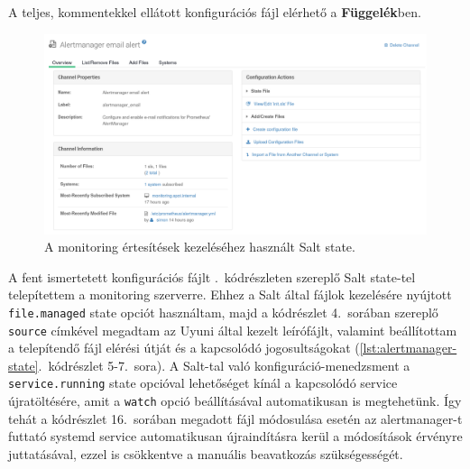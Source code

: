 A teljes, kommentekkel ellátott konfigurációs fájl elérhető a \textbf{Függelék}ben. %


\begin{figure}[ht]
	\centering
	\includegraphics[width=15cm]{figures/alertmanager-state.png}
	\caption{A monitoring értesítések kezeléséhez használt Salt state.}
	\label{fig:alertmanager-state}
\end{figure}



A fent ismertetett konfigurációs fájlt .~kódrészleten szereplő Salt state-tel telepítettem a monitoring szerverre. Ehhez a Salt által fájlok kezelésére nyújtott \texttt{file.managed} state opciót használtam, majd a kódrészlet 4.~sorában szereplő \texttt{source} címkével megadtam az Uyuni által kezelt leírófájlt, valamint beállítottam a telepítendő fájl elérési útját és a kapcsolódó jogosultságokat (\ref{lst:alertmanager-state}.~kódrészlet 5-7.~sora). 
A Salt-tal való konfiguráció-menedzsment a \texttt{service.running} state opcióval lehetőséget kínál a kapcsolódó service újratöltésére, amit a \texttt{watch} opció beállításával automatikusan is megtehetünk. Így tehát a kódrészlet 16.~sorában megadott fájl módosulása esetén az alertmanager-t futtató systemd service automatikusan újraindításra kerül a módosítások érvényre juttatásával, ezzel is csökkentve a manuális beavatkozás szükségességét.





